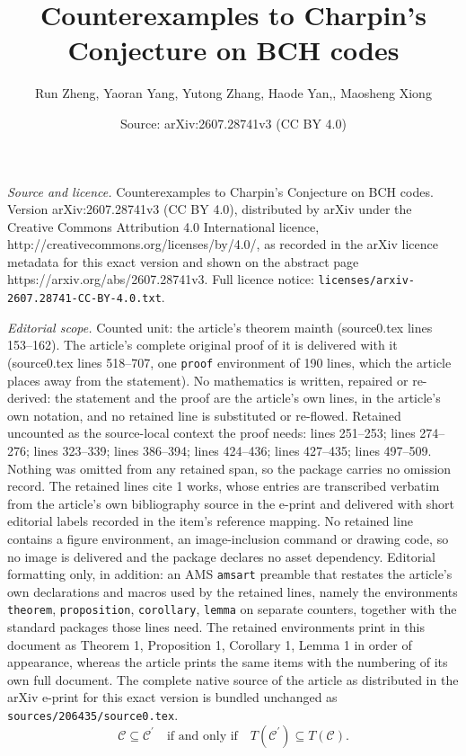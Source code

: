 \documentclass[10pt,a4paper]{amsart}
\title{Counterexamples to Charpin's Conjecture on BCH codes}
\author{Run Zheng, Yaoran Yang, Yutong Zhang, Haode Yan,, Maosheng Xiong}
\date{Source: arXiv:2607.28741v3 (CC BY 4.0)}
\begin{document}
\maketitle

\noindent\emph{Source and licence.} Counterexamples to Charpin's Conjecture on BCH codes. Version arXiv:2607.28741v3 (CC BY 4.0), distributed by arXiv under the Creative Commons Attribution 4.0 International licence, http://creativecommons.org/licenses/by/4.0/, as recorded in the arXiv licence metadata for this exact version and shown on the abstract page https://arxiv.org/abs/2607.28741v3. Full licence notice: \texttt{licenses/arxiv-2607.28741-CC-BY-4.0.txt}.\par\smallskip

\noindent\textit{Editorial scope.} Counted unit: the article's theorem mainth (source0.tex lines 153--162). The article's complete original proof of it is delivered with it (source0.tex lines 518--707, one \texttt{proof} environment of 190 lines, which the article places away from the statement). No mathematics is written, repaired or re-derived: the statement and the proof are the article's own lines, in the article's own notation, and no retained line is substituted or re-flowed.  Retained uncounted as the source-local context the proof needs: lines 251--253; lines 274--276; lines 323--339; lines 386--394; lines 424--436; lines 427--435; lines 497--509.  Nothing was omitted from any retained span, so the package carries no omission record.  The retained lines cite 1 works, whose entries are transcribed verbatim from the article's own bibliography source in the e-print and delivered with short editorial labels recorded in the item's reference mapping.  No retained line contains a figure environment, an image-inclusion command or drawing code, so no image is delivered and the package declares no asset dependency.  Editorial formatting only, in addition: an AMS \texttt{amsart} preamble that restates the article's own declarations and macros used by the retained lines, namely the environments \texttt{theorem}, \texttt{proposition}, \texttt{corollary}, \texttt{lemma} on separate counters, together with the standard packages those lines need.  The retained environments print in this document as Theorem 1, Proposition 1, Corollary 1, Lemma 1 in order of appearance, whereas the article prints the same items with the numbering of its own full document.  The complete native source of the article as distributed in the arXiv e-print for this exact version is bundled unchanged as \texttt{sources/206435/source0.tex}.
\begin{equation}\label{pre2}
\mathcal{C}\subseteq \mathcal{C}^{\prime} \quad \text{if and only if} \quad T(\mathcal{C}^{\prime}) \subseteq T(\mathcal{C}).
\end{equation}
\end{document}

